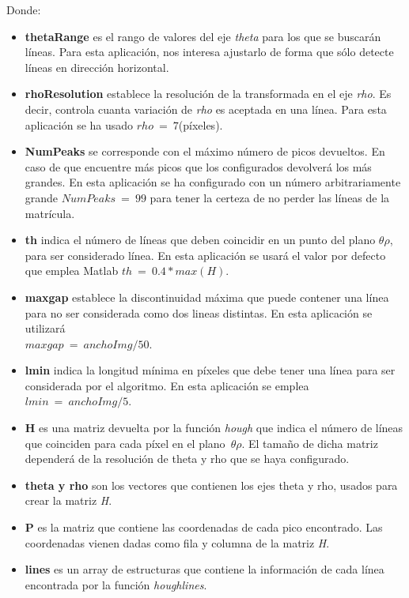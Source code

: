 Donde:
\begin{itemize}
\item \textbf{thetaRange} es el rango de valores del eje \emph{theta} para los que se buscarán líneas. Para esta aplicación, nos interesa ajustarlo de forma que sólo detecte líneas en dirección horizontal.

\item \textbf{rhoResolution} establece la resolución de la transformada en el eje \emph{rho}. Es decir, controla cuanta variación de \emph{rho} es aceptada en una línea. Para esta aplicación se ha usado $rho~=~7$(píxeles).

\item\textbf{NumPeaks} se corresponde con el máximo número de picos devueltos. En caso de que encuentre más picos que los configurados devolverá los más grandes. En esta aplicación se ha configurado con un número arbitrariamente grande $NumPeaks~=~99$ para tener la certeza de no perder las líneas de la matrícula.

\item\textbf{th} indica el número de líneas que deben coincidir en un punto del plano $\theta\rho$, para ser considerado línea. En esta aplicación se usará el valor por defecto que emplea Matlab $th~=~0.4*max(H)$.

\item\textbf{maxgap} establece la discontinuidad máxima que puede contener una línea para no ser considerada como dos lineas distintas. En esta aplicación se utilizará\\ $maxgap~=~anchoImg/50$.

\item\textbf{lmin} indica la longitud mínima en píxeles que debe tener una línea para ser considerada por el algoritmo. En esta aplicación se emplea $lmin~=~anchoImg/5$.

\item\textbf{H} es una matriz devuelta por la función \emph{hough} que indica el número de líneas que coinciden para cada píxel en el plano~$\theta\rho$. El tamaño de dicha matriz dependerá de la resolución de theta y rho que se haya configurado.

\item\textbf{theta y rho} son los vectores que contienen los ejes theta y rho, usados para crear la matriz \emph{H}.

\item\textbf{P} es la matriz que contiene las coordenadas de cada pico encontrado. Las coordenadas vienen dadas como fila y columna de la matriz \emph{H}.

\item\textbf{lines} es un array de estructuras que contiene la información de cada línea encontrada por la función \emph{houghlines}.
\end{itemize}

